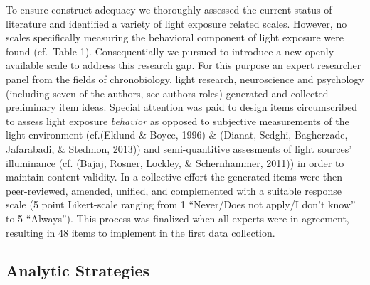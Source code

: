\documentclass[
  english,
  man]{apa6}
\begin{document}
To ensure construct adequacy we thoroughly assessed the current status of literature and identified a variety of light exposure related scales. However, no scales specifically measuring the behavioral component of light exposure were found (cf.~Table 1). Consequentially we pursued to introduce a new openly available scale to address this research gap. For this purpose an expert researcher panel from the fields of chronobiology, light research, neuroscience and psychology (including seven of the authors, see authors roles) generated and collected preliminary item ideas. Special attention was paid to design items circumscribed to assess light exposure \emph{behavior} as opposed to subjective measurements of the light environment (cf.(Eklund \& Boyce, 1996) \& (Dianat, Sedghi, Bagherzade, Jafarabadi, \& Stedmon, 2013)) and semi-quantitive assesments of light sources' illuminance (cf. (Bajaj, Rosner, Lockley, \& Schernhammer, 2011)) in order to maintain content validity. In a collective effort the generated items were then peer-reviewed, amended, unified, and complemented with a suitable response scale (5 point Likert-scale ranging from 1 ``Never/Does not apply/I don't know'' to 5 ``Always''). This process was finalized when all experts were in agreement, resulting in 48 items to implement in the first data collection.

\hypertarget{analytic-strategies}{%
\subsection{Analytic Strategies}\label{analytic-strategies}}
\end{document}
